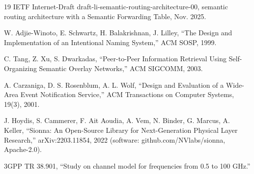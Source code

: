 \documentclass[journal]{IEEEtran}
\begin{document}
\begin{thebibliography}{19}
IETF Internet-Draft draft-li-semantic-routing-architecture-00, semantic routing architecture with a Semantic Forwarding Table, Nov. 2025.

W. Adjie-Winoto, E. Schwartz, H. Balakrishnan, J. Lilley, ``The Design and Implementation of an Intentional Naming System,'' ACM SOSP, 1999.

C. Tang, Z. Xu, S. Dwarkadas, ``Peer-to-Peer Information Retrieval Using Self-Organizing Semantic Overlay Networks,'' ACM SIGCOMM, 2003.

A. Carzaniga, D. S. Rosenblum, A. L. Wolf, ``Design and Evaluation of a Wide-Area Event Notification Service,'' ACM Transactions on Computer Systems, 19(3), 2001.

J. Hoydis, S. Cammerer, F. Ait Aoudia, A. Vem, N. Binder, G. Marcus, A. Keller, ``Sionna: An Open-Source Library for Next-Generation Physical Layer Research,'' arXiv:2203.11854, 2022 (software: github.com/NVlabs/sionna, Apache-2.0).

3GPP TR 38.901, ``Study on channel model for frequencies from 0.5 to 100 GHz.''

\end{thebibliography}
\end{document}
